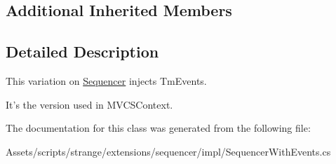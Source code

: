 \subsection*{Additional Inherited Members}


\subsection{Detailed Description}
This variation on \hyperlink{classstrange_1_1extensions_1_1sequencer_1_1impl_1_1_sequencer}{Sequencer} injects Tm\-Events. 

It's the version used in M\-V\-C\-S\-Context. 

The documentation for this class was generated from the following file\-:\begin{DoxyCompactItemize}
\item 
Assets/scripts/strange/extensions/sequencer/impl/Sequencer\-With\-Events.\-cs\end{DoxyCompactItemize}
